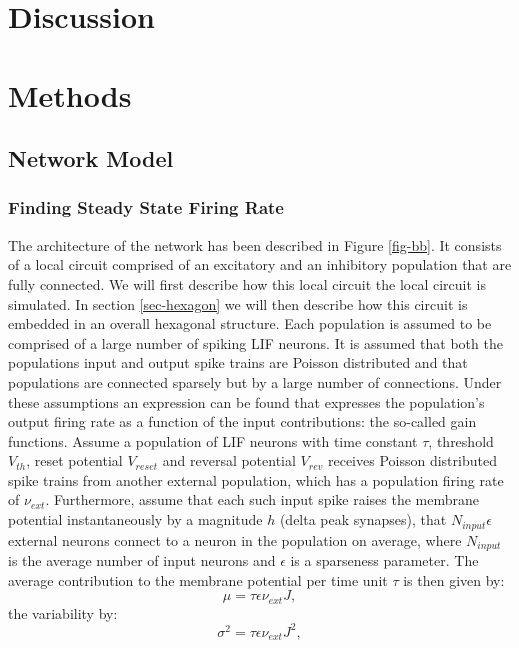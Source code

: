 \documentclass[12pt]{article}
\begin{document}
\section{Discussion}

\section*{Methods}
\label{sec-methods}
\subsection{Network Model}
\subsubsection{Finding Steady State Firing Rate}
\label{sec-steady}
The architecture of the network has been described in Figure \ref{fig-bb}. It consists of a local circuit comprised of an excitatory and an inhibitory
population that are fully connected. We will first describe how this local circuit the local circuit is simulated. 
In section \ref{sec-hexagon} we will then describe how this circuit is embedded in an overall hexagonal structure.
Each population
is assumed to be comprised of a large number of spiking LIF neurons. It is assumed that both the populations input and output spike trains
are Poisson distributed and that populations are connected sparsely but by a large number of connections. Under these assumptions an expression
can be found that expresses the population's output firing rate as a function of the input contributions: the so-called gain functions.
Assume a population of LIF neurons with time constant $\tau$, threshold $V_{th}$, reset potential $V_{reset}$ and reversal potential $V_{rev}$
receives Poisson distributed spike trains from another external population, which has a population firing rate of $\nu_{ext}$. 
Furthermore, assume that each such input spike raises the membrane potential
instantaneously by a magnitude $h$ (delta peak synapses), that $N_{input}\epsilon$ external neurons connect to a neuron in the population on average, 
where $N_{input}$ is the average number of input neurons and $\epsilon$ is a sparseness parameter. The average contribution to the
membrane potential per time unit $\tau$ is then given by:
\begin{equation}
  \mu = \tau \epsilon \nu_{ext} J, 
\end{equation}
the variability by:
\begin{equation}
  \sigma^2 = \tau \epsilon \nu_{ext} J^2,
\end{equation}
\end{document}

